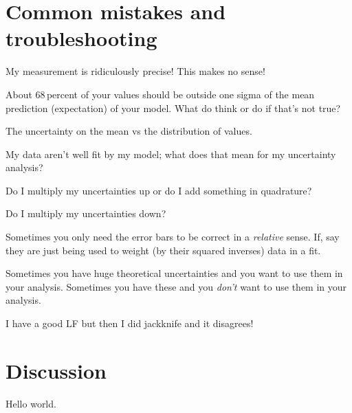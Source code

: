 \documentclass[10pt]{article}
\begin{document}
\section{Common mistakes and troubleshooting}

My measurement is ridiculously precise! This makes no sense!

About 68\,percent of your values should be outside one sigma of the
mean prediction (expectation) of your model. What do think or do if
that's not true?

The uncertainty on the mean vs the distribution of values.

My data aren't well fit by my model; what does that mean for my uncertainty
analysis?

Do I multiply my uncertainties up or do I add something in quadrature?

Do I multiply my uncertainties down?

Sometimes you only need the error bars to be correct in a
\emph{relative} sense. If, say they are just being used to weight (by
their squared inverses) data in a fit.

Sometimes you have huge theoretical uncertainties and you want to use
them in your analysis. Sometimes you have these and you \emph{don't} want
to use them in your analysis.

I have a good LF but then I did jackknife and it disagrees!

\section{Discussion}

Hello world.

\clearpage\raggedright

\end{document}
